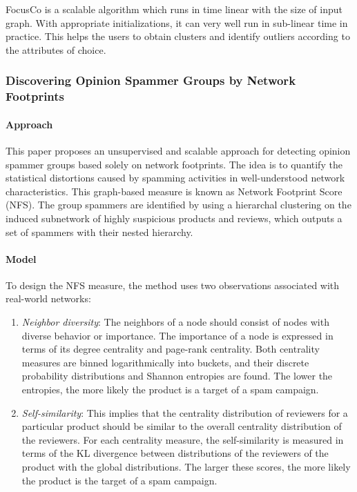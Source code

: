 \documentclass[11pt, oneside]{article}   	%
\begin{document}
\quad FocusCo is a scalable algorithm which runs in time linear with the size of input graph.
With appropriate initializations, it can very well run in sub-linear time in practice.
This helps the users to obtain clusters and identify outliers according to the attributes of choice.

\subsubsection{Discovering Opinion Spammer Groups by Network Footprints}

\paragraph{Approach}
\quad

\quad This paper \cite{dosgnf} proposes an unsupervised and scalable approach for detecting opinion spammer groups based solely on network footprints.
The idea is to quantify the statistical distortions caused by spamming activities in well-understood network characteristics.
This graph-based measure is known as Network Footprint Score (NFS).
The group spammers are identified by using a hierarchal clustering on the induced subnetwork of highly suspicious products and reviews, which outputs a set of spammers with their nested hierarchy.

\paragraph{Model}
\quad

To design the NFS measure, the method uses two observations associated with real-world networks:

\begin{enumerate}
\item \emph{Neighbor diversity}: The neighbors of a node should consist of nodes with diverse behavior or importance.
The importance of a node is expressed in terms of its degree centrality and page-rank centrality.
Both centrality measures are binned logarithmically into buckets, and their discrete probability distributions and Shannon entropies are found.
The lower the entropies, the more likely the product is a target of a spam campaign.
\item \emph{Self-similarity}: This implies that the centrality distribution of reviewers for a particular product should be similar to the overall centrality distribution of the reviewers.
For each centrality measure, the self-similarity is measured in terms of the KL divergence between distributions of the reviewers of the product with the global distributions.
The larger these scores, the more likely the product is the target of a spam campaign.
\end{enumerate}
\end{document}
